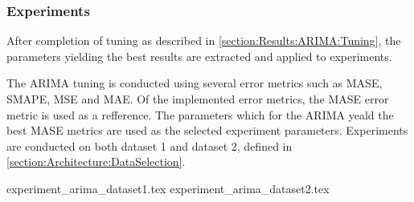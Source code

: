 \subsubsection{Experiments}

After completion of tuning as described in \cref{section:Results:ARIMA:Tuning},
the parameters yielding the best results are extracted and applied to experiments.

The ARIMA tuning is conducted using several error metrics such as MASE, SMAPE, MSE and MAE.
Of the implemented error metrics, the MASE error metric is used as a refference.
The parameters which for the ARIMA yeald the best MASE metrics are used as the selected experiment parameters.
Experiments are conducted on both dataset 1 and dataset 2, defined in \cref{section:Architecture:DataSelection}.


{experiment_arima_dataset1.tex}
{experiment_arima_dataset2.tex}

